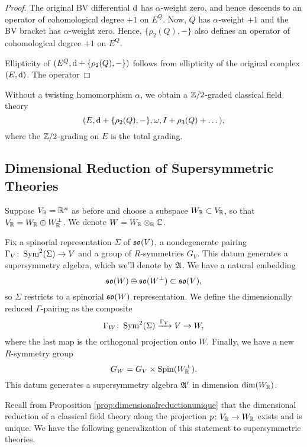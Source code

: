 \documentclass[10pt, oneside]{article}
\begin{document}
\begin{proof}
The original BV differential ${\rm d}$ has $\alpha$-weight zero, and hence descends to an operator of cohomological degree $+1$ on $E^Q$. 
Now, $Q$ has $\alpha$-weight $+1$ and the BV bracket has $\alpha$-weight zero. 
Hence, $\{\rho_{2}(Q), -\}$ also defines an operator of cohomological degree $+1$ on $E^Q$. 

Ellipticity of $(E^Q, {\rm d} + \{\rho_2 (Q), -\})$ follows from ellipticity of the original complex $(E, {\rm d})$.
The operator 
\end{proof}


\begin{remark}
Without a twisting homomorphism $\alpha$, we obtain a $\mathbb Z/2$-graded classical field theory
\[(E, {\rm d} + \{\rho_2(Q), -\}, \omega, I + \rho_3(Q) + \dots),\]
where the $\mathbb Z/2$-grading on $E$ is the total grading.
\end{remark}

\subsection{Dimensional Reduction of Supersymmetric Theories}

Suppose $V_\mathbb R=\mathbb R^n$ as before and choose a subspace $W_\mathbb R\subset V_\mathbb R$, so that $V_\mathbb R = W_\mathbb R\oplus W^\perp_\mathbb R$. We denote $W=W_{\mathbb R}\otimes_{\mathbb R} \mathbb C$.

Fix a spinorial representation $\Sigma$ of $\mathfrak{so}(V)$, a nondegenerate pairing $\Gamma_V\colon \operatorname{Sym}^2(\Sigma)\rightarrow V$ and a group of $R$-symmetries $G_V$.  This datum generates a supersymmetry algebra, which we'll denote by $\mathfrak{A}$.  We have a natural embedding
\[\mathfrak{so}(W)\oplus \mathfrak{so}(W^{\perp})\subset \mathfrak{so}(V),\]
so $\Sigma$ restricts to a spinorial $\mathfrak{so}(W)$ representation. We define the dimensionally reduced $\Gamma$-pairing as the composite
\[\Gamma_W\colon \operatorname{Sym}^2(\Sigma)\xrightarrow{\Gamma_V} V\rightarrow W,\]
where the last map is the orthogonal projection onto $W$. Finally, we have a new $R$-symmetry group
\[G_W = G_V\times \mathrm{Spin}(W^\perp_\mathbb R).\]
This datum generates a supersymmetry algebra $\mathfrak{A}'$ in dimension $\mathrm{dim}(W_\mathbb R)$.

Recall from Proposition \ref{prop:dimensionalreductionunique} that the dimensional reduction of a classical field theory along the projection $p\colon V_\mathbb R\rightarrow W_\mathbb R$ exists and is unique. We have the following generalization of this statement to supersymmetric theories.
\end{document}
